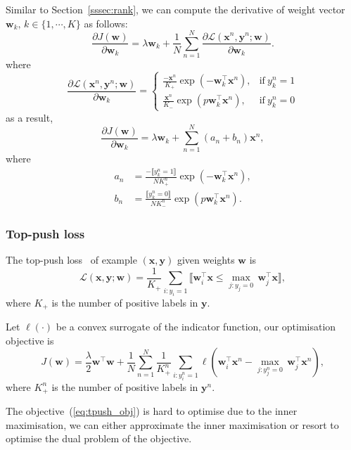 \documentclass[9pt]{extarticle}
\newcommand{\llb}{\llbracket}
\newcommand{\rrb}{\rrbracket}
\newcommand{\x}{\mathbf{x}}
\newcommand{\y}{\mathbf{y}}
\newcommand{\1}{\mathbf{1}}
\newcommand{\w}{\mathbf{w}}
\newcommand{\LCal}{\mathcal{L}}
\begin{document}
Similar to Section~\ref{sssec:rank}, we can compute the derivative of weight vector $\w_k, \, k \in \{1,\cdots,K\}$ as follows:
$$
\frac{\partial J(\w)} {\partial \w_k} = \lambda \w_k + \frac{1}{N} \sum_{n=1}^N \frac{\partial \LCal(\x^n, \y^n; \w)} {\partial \w_k}.
$$
where
\begin{equation}
\frac{\partial \LCal(\x^n, \y^n; \w)} {\partial \w_k} =
\begin{cases}
\frac{-\x^n}{K_+} \exp(-\w_k^\top \x^n),  & \text{if} \ y_k^n=1 \\
\frac{ \x^n}{K_-} \exp(p\w_k^\top \x^n),  & \text{if} \ y_k^n=0
\end{cases}
\end{equation}
as a result,
\begin{equation}
\label{eq:grad_pclass}
\frac{\partial J(\w)} {\partial \w_k} = \lambda \w_k + \sum_{n=1}^N (a_n + b_n) \x^n,
\end{equation}
where
\begin{align*}
a_n &= \frac{-\llb y_k^n=1 \rrb} {N K_+^n} \exp( -\w_k^\top \x^n), \\
b_n &= \frac{ \llb y_k^n=0 \rrb} {N K_-^n} \exp(p \w_k^\top \x^n).
\end{align*}



\subsubsection{Top-push loss}
\label{sssec:tpush}

The top-push loss~\cite{li2014top} of example $(\x, \y)$ given weights $\w$ is
\begin{equation}
\label{eq:tpush_loss}
\LCal(\x, \y; \w) = \frac{1}{K_+} \sum_{i:y_i=1} \llb \w_i^\top \x \le \underset{j:y_j=0}{\max} \, \w_j^\top \x \rrb,
\end{equation}
where $K_+$ is the number of positive labels in $\y$.

Let $\ell(\cdot)$ be a convex surrogate of the indicator function, our optimisation objective is
\begin{equation}
\label{eq:tpush_obj}
J(\w) = \frac{\lambda}{2} \w^\top \w + \frac{1}{N} \sum_{n=1}^N 
        \frac{1}{K_+^n} \sum_{i:y_i^n=1} \ell \left( \w_i^\top \x^n - \underset{j:y_j^n=0}{\max} \, \w_j^\top \x^n \right),
\end{equation}
where $K_+^n$ is the number of positive labels in $\y^n$.

The objective~(\ref{eq:tpush_obj}) is hard to optimise due to the inner maximisation,
we can either approximate the inner maximisation or resort to optimise the dual problem of the objective.
\end{document}
